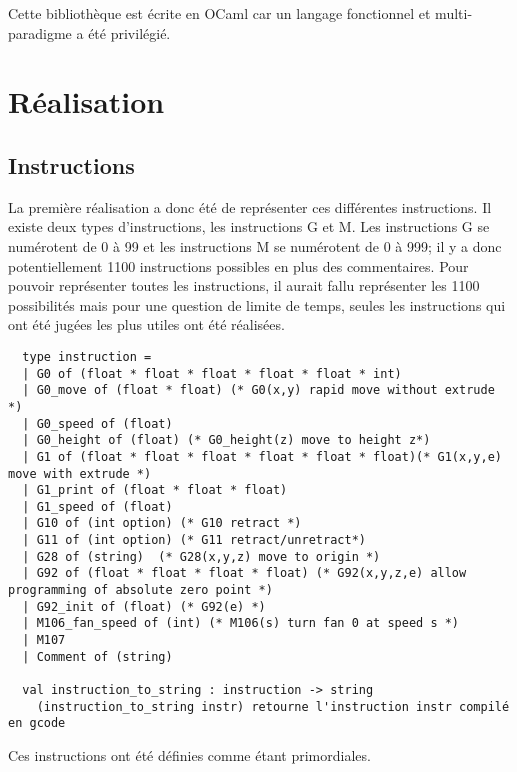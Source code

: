 \documentclass[11pt, titlepage]{article}
\begin{document}
Cette bibliothèque est écrite en OCaml car un langage fonctionnel et multi-paradigme a été privilégié.

\newpage
\section{Réalisation}

\subsection{Instructions}
La première réalisation a donc été de représenter ces différentes instructions. Il existe deux types d'instructions, les instructions G et M. Les instructions G se numérotent de 0 à 99 et les instructions M se numérotent de 0 à 999; il y a donc potentiellement 1100 instructions possibles en plus des commentaires.
Pour pouvoir représenter toutes les instructions, il aurait fallu représenter les 1100 possibilités mais pour une question de limite de temps, seules les instructions qui ont été jugées les plus utiles ont été réalisées.

\begin{lstlisting}
  type instruction =
  | G0 of (float * float * float * float * float * int)
  | G0_move of (float * float) (* G0(x,y) rapid move without extrude *)
  | G0_speed of (float)
  | G0_height of (float) (* G0_height(z) move to height z*)
  | G1 of (float * float * float * float * float * float)(* G1(x,y,e) move with extrude *)
  | G1_print of (float * float * float)
  | G1_speed of (float)
  | G10 of (int option) (* G10 retract *)
  | G11 of (int option) (* G11 retract/unretract*)
  | G28 of (string)  (* G28(x,y,z) move to origin *)
  | G92 of (float * float * float * float) (* G92(x,y,z,e) allow programming of absolute zero point *)
  | G92_init of (float) (* G92(e) *)
  | M106_fan_speed of (int) (* M106(s) turn fan 0 at speed s *)
  | M107
  | Comment of (string)
  
  val instruction_to_string : instruction -> string
  	(instruction_to_string instr) retourne l'instruction instr compilé en gcode
\end{lstlisting}

Ces instructions ont été définies comme étant primordiales.
\end{document}
